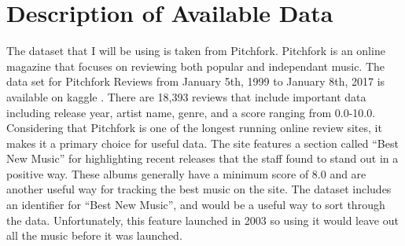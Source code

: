 \documentclass{article}
\begin{document}
\section{Description of Available
Data}\label{description-of-available-data}

The dataset that I will be using is taken from Pitchfork. Pitchfork is
an online magazine that focuses on reviewing both popular and
independant music. The data set for Pitchfork Reviews from January 5th,
1999 to January 8th, 2017 is available on kaggle \citep{kaggle}. There
are 18,393 reviews that include important data including release year,
artist name, genre, and a score ranging from 0.0-10.0. Considering that
Pitchfork is one of the longest running online review sites, it makes it
a primary choice for useful data. The site features a section called
``Best New Music'' for highlighting recent releases that the staff found
to stand out in a positive way. These albums generally have a minimum
score of 8.0 and are another useful way for tracking the best music on
the site. The dataset includes an identifier for ``Best New Music'', and
would be a useful way to sort through the data. Unfortunately, this
feature launched in 2003 so using it would leave out all the music
before it was launched.



\end{document}
